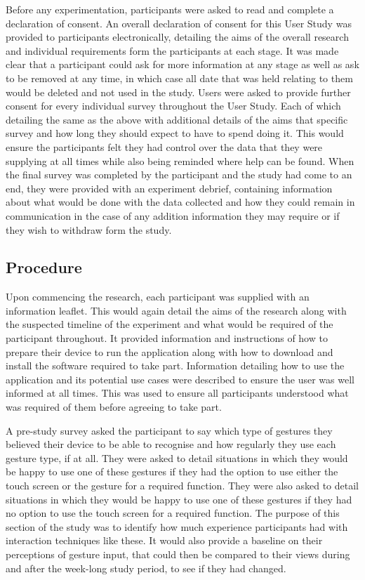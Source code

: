 \documentclass{l4proj}
\begin{document}
Before any experimentation, participants were asked to read and complete a declaration of consent. An overall declaration of consent for this User Study was provided to participants electronically, detailing the aims of the overall research and individual requirements form the participants at each stage. It was made clear that a participant could ask for more information at any stage as well as ask to be removed at any time, in which case all date that was held relating to them would be deleted and not used in the study. Users were asked to provide further consent for every individual survey throughout the User Study. Each of which detailing the same as the above with additional details of the aims that specific survey and how long they should expect to have to spend doing it. This would ensure the participants felt they had control over the data that they were supplying at all times while also being reminded where help can be found. When the final survey was completed by the participant and the study had come to an end, they were provided with an experiment debrief, containing information about what would be done with the data collected and how they could remain in communication in the case of any addition information they may require or if they wish to withdraw form the study. 

\subsection{Procedure}

Upon commencing the research, each participant was supplied with an information leaflet. This would again detail the aims of the research along with the suspected timeline of the experiment and what would be required of the participant throughout. It provided information and instructions of how to prepare their device to run the application along with how to download and install the software required to take part. Information detailing how to use the application and its potential use cases were described to ensure the user was well informed at all times. This was used to ensure all participants understood what was required of them before agreeing to take part.

A pre-study survey asked the participant to say which type of gestures they believed their device to be able to recognise and how regularly they use each gesture type, if at all. They were asked to detail situations in which they would be happy to use one of these gestures if they had the option to use either the touch screen  or the gesture for a required function. They were also asked to detail situations in which they would be happy to use one of these gestures if they had no option to use the touch screen for a required function. The purpose of this section of the study was to identify how much experience participants had with interaction techniques like these. It would also provide a baseline on their perceptions of gesture input, that could then be compared to their views during and after the week-long study period, to see if they had changed.
\end{document}
